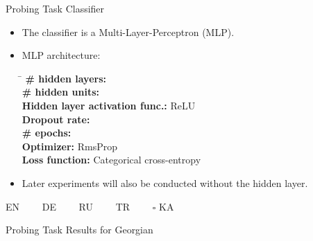 \documentclass[accentcolor=tud1a,colorbacktitle,inverttitle,landscape,german,presentation,t]{tudbeamer}
\begin{document}
\begin{frame}{Probing Task Classifier}{}
	\vspace*{-4mm}
	\begin{itemize}\setlength\itemsep{1em}
		\item The classifier is a Multi-Layer-Perceptron (MLP).
		\item MLP architecture:
		\begin{center}\parbox{0cm}{\begin{tabbing}
			\hspace*{5.5cm}\=\kill
			\textbf{\# hidden layers:} 				 			\\[1mm]
			\textbf{\# hidden units:} 				 		\\[1mm]
			\textbf{Hidden layer activation func.:}	\>  	ReLU		\\[1mm]
			\textbf{Dropout rate:}					 		\\[1mm]
			\textbf{\# epochs:} 					 			\\[1mm]
			\textbf{Optimizer:} 					\> 	RmsProp	\\[1mm]
			\textbf{Loss function:} 				\> Categorical cross-entropy
		\end{tabbing}}
		\end{center}
		\item Later experiments will also be conducted without the hidden layer.
	\end{itemize}
\end{frame}


\begin{frame}[plain]{}{}
	
	
	

	\begin{center}
		\textcolor{tud2a}{} EN~~~~
		\textcolor{tud1a}{} DE~~~~
		\textcolor{tud1a!50}{} RU~~~~
		\textcolor{gray}{} TR~~~~
		$\square$ KA
	\end{center}
\end{frame}


\begin{frame}{Probing Task Results for Georgian}{}
	\vspace*{-8mm}
	
\end{frame}
\end{document}
